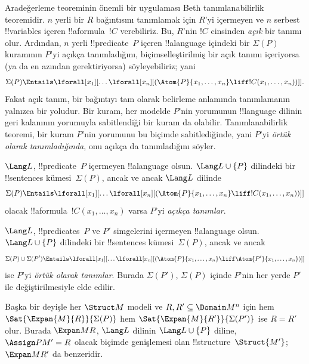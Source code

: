 \documentclass[../../../include/open-logic-section]{subfiles}
\begin{document}


Aradeğerleme teoreminin önemli bir uygulaması Beth tanımlanabilirlik
teoremidir. $n$ yerli bir $R$ bağıntısını tanımlamak için $R$'yi
içermeyen ve $n$ serbest !!{variable}s içeren !!a{formula}~$!C$
verebiliriz. Bu, $R$'nin $!C$ cinsinden \emph{açık} bir tanımı olur.
Ardından, $n$ yerli !!{predicate}~$P$ içeren !!a{language} içindeki
bir $\Sigma(P)$ kuramının $P$'yi açıkça tanımladığını, biçimselleştirilmiş
bir açık tanımı içeriyorsa (ya da en azından gerektiriyorsa)
söyleyebiliriz; yani
\[
\Sigma(P) \Entails \lforall[x_1][\dots
  \lforall[x_n][(\Atom{P}{x_1,\dots, x_n} \liff !C(x_1, \dots,
    x_n))]].
\]
Fakat açık tanım, bir bağıntıyı tam olarak belirleme anlamında
tanımlamanın yalnızca bir yoludur. Bir kuram, her modelde $P$'nin
yorumunun !!{language} dilinin geri kalanının yorumuyla sabitlendiği
bir kuram da olabilir. Tanımlanabilirlik teoremi, bir kuram $P$'nin
yorumunu bu biçimde sabitlediğinde, yani $P$'yi \emph{örtük olarak
tanımladığında}, onu açıkça da tanımladığını söyler.

\begin{defn}
$\Lang L$, !!{predicate}~$P$ içermeyen !!a{language} olsun.
$\Lang L\cup\{P\}$ dilindeki bir !!{sentence}s kümesi~$\Sigma(P)$,
ancak ve ancak $\Lang L$ dilinde
\[
\Sigma(P) \Entails \lforall[x_1][\dots
  \lforall[x_n][(\Atom{P}{x_1,\dots, x_n} \liff !C(x_1, \dots,
    x_n))]]
\]
olacak !!a{formula}~$!C(x_1,\dots,x_n)$ varsa $P$'yi
\emph{açıkça tanımlar}.
\end{defn}

\begin{defn}
$\Lang L$, !!{predicate}s~$P$ ve $P'$ simgelerini içermeyen
!!a{language} olsun. $\Lang L\cup\{P\}$ dilindeki bir !!{sentence}s
kümesi~$\Sigma(P)$, ancak ve ancak
\[
\Sigma(P) \cup \Sigma(P') \Entails \lforall[x_1][\dots
  \lforall[x_n][(\Atom{P}{x_1,\dots, x_n} \liff \Atom{P'}{x_1,\dots,
      x_n})]]
\]
ise $P$'yi \emph{örtük olarak tanımlar}. Burada $\Sigma(P')$,
$\Sigma(P)$ içinde $P$'nin her yerde $P'$ ile değiştirilmesiyle elde
edilir.
\end{defn}

Başka bir deyişle her $\Struct M$ modeli ve
$R,R'\subseteq\Domain M^n$ için hem
$\Sat{\Expan{M}{R}}{\Sigma(P)}$ hem
$\Sat{\Expan{M}{R'}}{\Sigma(P')}$ ise $R=R'$ olur. Burada
$\Expan M R$, $\Lang L$ dilinin $\Lang L\cup\{P\}$ diline,
$\Assign P{M'}=R$ olacak biçimde genişlemesi olan
!!{structure}~$\Struct{M'}$; $\Expan M{R'}$ da benzeridir.
\end{document}
